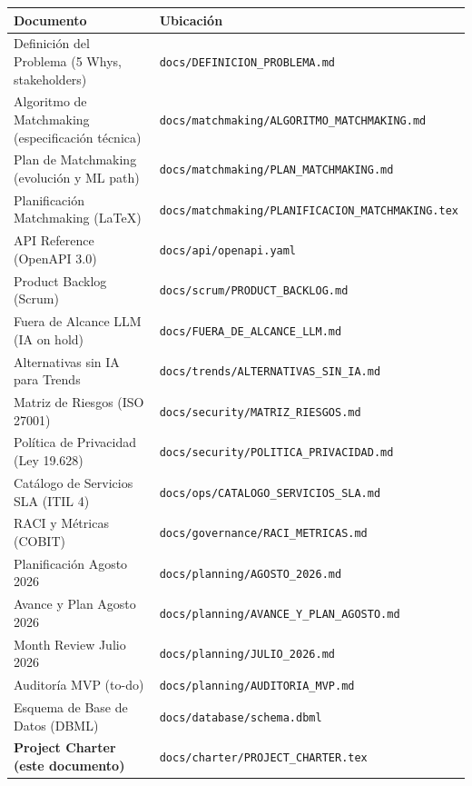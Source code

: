 \documentclass[11pt,a4paper]{article}
\begin{document}
\begin{table}[H]
    \centering
    \renewcommand{\arraystretch}{1.2}
    \begin{tabularx}{\textwidth}{>{\hsize=0.5\hsize}X >{\hsize=0.5\hsize}X}
        \toprule
        \textbf{Documento} & \textbf{Ubicación} \\
        \midrule
        Definición del Problema (5 Whys, stakeholders) & \texttt{docs/DEFINICION\_PROBLEMA.md} \\
        Algoritmo de Matchmaking (especificación técnica) & \texttt{docs/matchmaking/ALGORITMO\_MATCHMAKING.md} \\
        Plan de Matchmaking (evolución y ML path) & \texttt{docs/matchmaking/PLAN\_MATCHMAKING.md} \\
        Planificación Matchmaking (LaTeX) & \texttt{docs/matchmaking/PLANIFICACION\_MATCHMAKING.tex} \\
        API Reference (OpenAPI 3.0) & \texttt{docs/api/openapi.yaml} \\
        Product Backlog (Scrum) & \texttt{docs/scrum/PRODUCT\_BACKLOG.md} \\
        Fuera de Alcance LLM (IA on hold) & \texttt{docs/FUERA\_DE\_ALCANCE\_LLM.md} \\
        Alternativas sin IA para Trends & \texttt{docs/trends/ALTERNATIVAS\_SIN\_IA.md} \\
        Matriz de Riesgos (ISO 27001) & \texttt{docs/security/MATRIZ\_RIESGOS.md} \\
        Política de Privacidad (Ley 19.628) & \texttt{docs/security/POLITICA\_PRIVACIDAD.md} \\
        Catálogo de Servicios SLA (ITIL 4) & \texttt{docs/ops/CATALOGO\_SERVICIOS\_SLA.md} \\
        RACI y Métricas (COBIT) & \texttt{docs/governance/RACI\_METRICAS.md} \\
        Planificación Agosto 2026 & \texttt{docs/planning/AGOSTO\_2026.md} \\
        Avance y Plan Agosto 2026 & \texttt{docs/planning/AVANCE\_Y\_PLAN\_AGOSTO.md} \\
        Month Review Julio 2026 & \texttt{docs/planning/JULIO\_2026.md} \\
        Auditoría MVP (to-do) & \texttt{docs/planning/AUDITORIA\_MVP.md} \\
        Esquema de Base de Datos (DBML) & \texttt{docs/database/schema.dbml} \\
        \textbf{Project Charter (este documento)} & \texttt{docs/charter/PROJECT\_CHARTER.tex} \\
        \bottomrule
    \end{tabularx}
\end{table}
\end{document}
